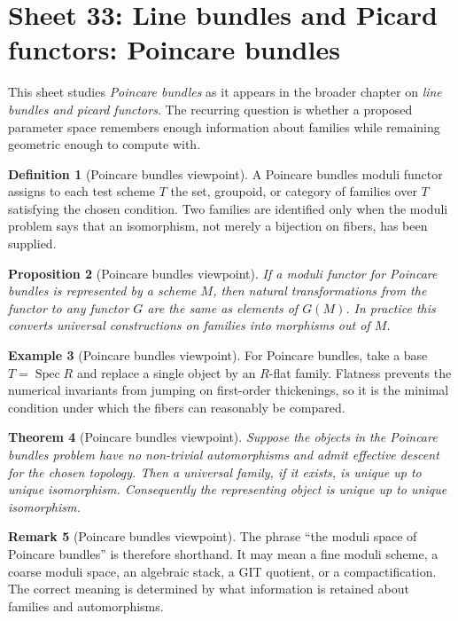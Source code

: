 \documentclass[11pt]{amsart}
\newtheorem{theorem}{Theorem}[section]
\newtheorem{proposition}[theorem]{Proposition}
\theoremstyle{definition}
\newtheorem{definition}[theorem]{Definition}
\newtheorem{example}[theorem]{Example}
\newtheorem{remark}[theorem]{Remark}
\newcommand{\Spec}{\operatorname{Spec}}
\begin{document}
\section{Sheet 33: Line bundles and Picard functors: Poincare bundles}
This sheet studies \emph{Poincare bundles} as it appears in the broader chapter on \emph{line bundles and picard functors}.  The recurring question is whether a proposed parameter space remembers enough information about families while remaining geometric enough to compute with.
\begin{definition}[Poincare bundles viewpoint]
A Poincare bundles moduli functor assigns to each test scheme $T$ the set, groupoid, or category of families over $T$ satisfying the chosen condition.  Two families are identified only when the moduli problem says that an isomorphism, not merely a bijection on fibers, has been supplied.
\end{definition}
\begin{proposition}[Poincare bundles viewpoint]
If a moduli functor for Poincare bundles is represented by a scheme $M$, then natural transformations from the functor to any functor $G$ are the same as elements of $G(M)$.  In practice this converts universal constructions on families into morphisms out of $M$.
\end{proposition}
\begin{example}[Poincare bundles viewpoint]
For Poincare bundles, take a base $T=\Spec R$ and replace a single object by an $R$-flat family.  Flatness prevents the numerical invariants from jumping on first-order thickenings, so it is the minimal condition under which the fibers can reasonably be compared.
\end{example}
\begin{theorem}[Poincare bundles viewpoint]
Suppose the objects in the Poincare bundles problem have no non-trivial automorphisms and admit effective descent for the chosen topology.  Then a universal family, if it exists, is unique up to unique isomorphism.  Consequently the representing object is unique up to unique isomorphism.
\end{theorem}
\begin{remark}[Poincare bundles viewpoint]
The phrase ``the moduli space of Poincare bundles'' is therefore shorthand.  It may mean a fine moduli scheme, a coarse moduli space, an algebraic stack, a GIT quotient, or a compactification.  The correct meaning is determined by what information is retained about families and automorphisms.
\end{remark}
\end{document}
